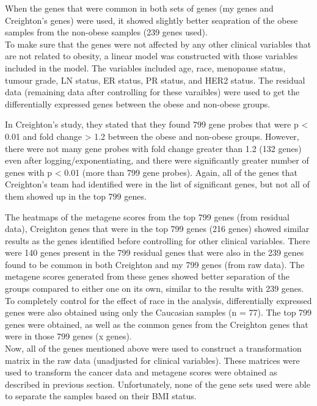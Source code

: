 \documentclass[a4paper, 11pt]{article}
\begin{document}
When the genes that were common in both sets of genes (my genes and Creighton's genes) were used, it showed slightly better seapration of the obese samples from the non-obese samples (239 genes used).\\

To make sure that the genes were not affected by any other clinical variables that are not related to obesity, a linear model was constructed with those variables included in the model.
The variables included age, race, menopause status, tumour grade, LN status, ER status, PR status, and HER2 status.
The residual data (remaining data after controlling for these varaibles) were used to get the differentially expressed genes between the obese and non-obese groups.

In Creighton's study, they stated that they found 799 gene probes that were p \textless{} 0.01 and fold change \textgreater{} 1.2 between the obese and non-obese groups.
However, there were not many gene probes with fold change greater than 1.2 (132 genes) even after logging/exponentiating, and there were significantly greater number of genes with p \textless{} 0.01 (more than 799 gene probes).
Again, all of the genes that Creighton's team had identified were in the list of significant genes, but not all of them showed up in the top 799 genes.

The heatmaps of the metagene scores from the top 799 genes (from residual data), Creighton genes that were in the top 799 genes (216 genes) showed similar results as the genes identified before controlling for other clinical variables.
There were 140 genes present in the 799 residual genes that were also in the 239 genes found to be common in both Creighton and my 799 genes (from raw data).
The metagene scores generated from these genes showed better separation of the groups compared to either one on its own, similar to the results with 239 genes.\\

To completely control for the effect of race in the analysis, differentially expressed genes were also obtained using only the Caucasian samples (n = 77).
The top 799 genes were obtained, as well as the common genes from the Creighton genes that were in those 799 genes (x genes).\\

Now, all of the genes mentioned above were used to construct a transformation matrix in the raw data (unadjusted for clinical variables).
These matrices were used to transform the cancer data and metagene scores were obtained as described in previous section.
Unfortunately, none of the gene sets used were able to separate the samples based on their BMI status.
\end{document}

